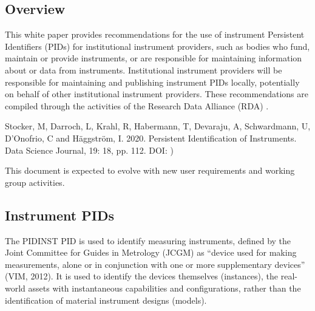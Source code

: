 \documentclass[a4paper,10pt,english]{sphinxmanual}
\begin{document}
\subsection{Overview}
\label{\detokenize{white-paper/overview:overview}}\label{\detokenize{white-paper/overview::doc}}
This white paper provides recommendations for the use of instrument
Persistent Identifiers (PIDs) for institutional instrument providers,
such as bodies who fund, maintain or provide instruments, or are
responsible for maintaining information about or data from instruments.
Institutional instrument providers will be responsible for maintaining
and publishing instrument PIDs locally, potentially on behalf of other
institutional instrument providers. These recommendations are compiled
through the activities of the Research Data Alliance (RDA) .%
\begin{footnote}[1]\sphinxAtStartFootnote
Stocker, M, Darroch, L, Krahl, R, Habermann, T, Devaraju, A,
Schwardmann, U, D’Onofrio, C and Häggström, I. 2020. Persistent
Identification of Instruments. Data Science Journal, 19: 18, pp.
1\textendash{}12. DOI: )
%
\end{footnote} This document is expected to evolve with
new user requirements and working group activities.


\subsection{Instrument PIDs}
\label{\detokenize{white-paper/instrument-pids:instrument-pids}}\label{\detokenize{white-paper/instrument-pids::doc}}
The PIDINST PID is used to identify measuring instruments, defined by
the Joint Committee for Guides in Metrology (JCGM) as “device used for
making measurements, alone or in conjunction with one or more
supplementary devices” (VIM, 2012). It is used to identify the devices
themselves (instances), the real-world assets with instantaneous
capabilities and configurations, rather than the identification of
material instrument designs (models).
\end{document}
